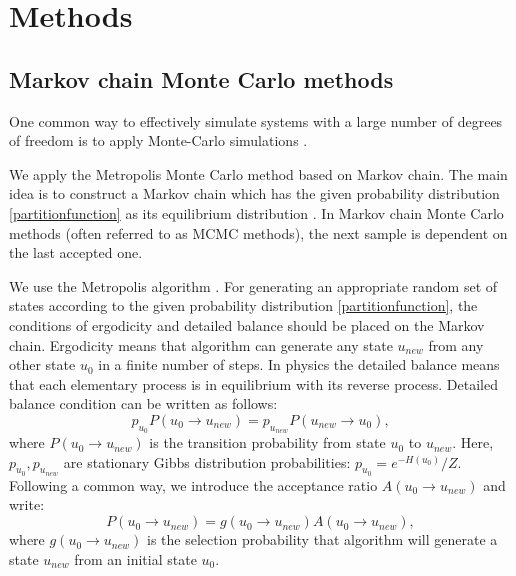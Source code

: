 \chapter{Methods} \label{ch:method}



\section{Markov chain Monte Carlo methods}
 One common way to effectively simulate systems with a large number of degrees of freedom is to apply Monte-Carlo simulations \cite{newman1999monte}. 
 
 We apply the Metropolis Monte Carlo method based on Markov chain. The main idea is to construct a Markov chain which has the given probability distribution \eqref{partitionfunction} as its equilibrium distribution . In Markov chain Monte Carlo methods (often referred to as MCMC methods),  the next sample is dependent on the last accepted one.  
 
  \par We use the Metropolis algorithm  \cite{doi:10.1063/1.1699114}. For generating an appropriate random set of states according to the given probability distribution \eqref{partitionfunction}, the conditions of ergodicity and detailed balance should be placed on the Markov chain.  
  Ergodicity means that algorithm can generate any state $u_{new}$ from any other state $u_0 $ in a finite number of steps. In physics the detailed balance means that each elementary process is in equilibrium with its reverse process. Detailed balance condition can be written as follows:
  \begin{equation}
  \label{detailedbalance}
  p_{u_0} P(u_0 \rightarrow u_{new} ) = p_{u_{new}} P( u_{new} \rightarrow u_0),
  \end{equation}
  where $P(u_0\rightarrow u_{new} )$ is the transition probability from state $u_0$ to $u_{new}$. Here, $p_{u_0},p_{u_{new}}$ are stationary Gibbs distribution probabilities: $p_{u_0} = e ^{-H(u_0)}/Z $.   Following a common way, we introduce the acceptance ratio $A(u_0 \rightarrow u_{new})$ and write:
  \begin{equation*}
  P(u_0 \rightarrow u_{new}) = g(u_0 \rightarrow u_{new}) A(u_0 \rightarrow u_{new}),
  \end{equation*}
where $g(u_0  \rightarrow u_{new} )$ is the selection probability that algorithm will generate a state $u_{new}$ from an initial state $u_0$. 

